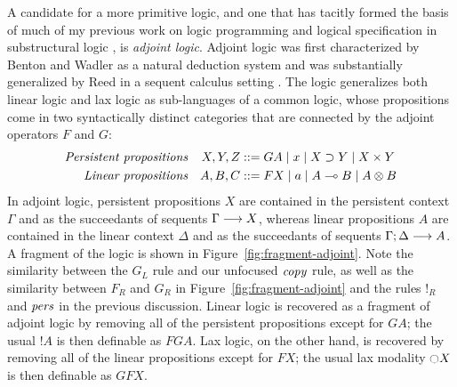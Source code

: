 A candidate for a more primitive logic, and one that has tacitly
formed the basis of much of my previous work on logic programming 
and logical specification in substructural logic
\cite{simmons09weak,simmons11logical}, is {\it
  adjoint logic}.  Adjoint logic was first characterized by Benton and
Wadler as a natural deduction system \cite{benton96linear} and was
substantially generalized by Reed in a sequent calculus setting
\cite{reed09judgmental}. The logic generalizes both linear logic and
lax logic as sub-languages of a common logic, whose propositions come
in two syntactically distinct categories that are connected by the
adjoint operators $F$ and $G$:
\begin{align*}
\mbox{\it Persistent propositions} & &
X, Y, Z & ::= G A \mid x \mid X \supset Y \mid X \times Y\\
\mbox{\it Linear propositions} & & 
A, B, C & ::= F X \mid a \mid A \multimap B \mid A \otimes B
\end{align*}
In adjoint logic, persistent propositions $X$ are contained in the
persistent context $\Gamma$ and as the succeedants of sequents
${\Gamma} \longrightarrow {X} \mathstrut$, whereas linear propositions $A$ are contained in
the linear context $\Delta$ and as the succeedants of sequents
${\Gamma};{\Delta} \longrightarrow {A} \mathstrut$. A fragment of the logic is shown in
Figure~\ref{fig:fragment-adjoint}.  Note the similarity between the
$G_L$ rule and our unfocused ${\it copy}$ rule, as well as the
similarity between $F_R$ and $G_R$ in
Figure~\ref{fig:fragment-adjoint} and the rules ${!}_R$ and ${\it
  pers}$ in the previous discussion.  Linear logic is recovered as a
fragment of adjoint logic by removing all of the persistent
propositions except for $GA$; the usual ${!}A$ is then definable as
$FGA$. Lax logic, on the other hand, is recovered by removing all of
the linear propositions except for $FX$; the usual lax modality
$\ocircle X$ is then definable as $GFX$.

